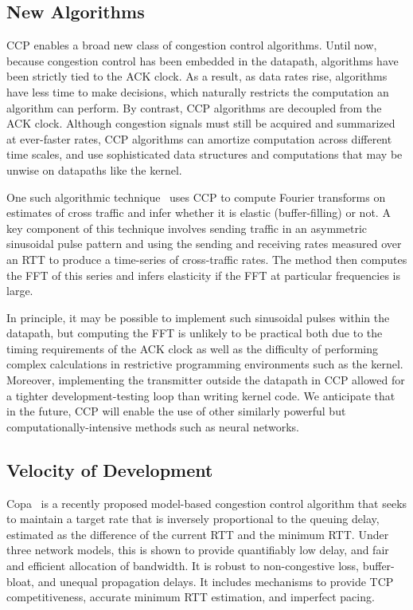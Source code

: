 \subsection{New Algorithms}
\label{s:capabilities:algs}

CCP enables a broad new class of congestion control algorithms.
Until now, because congestion control has been embedded in the datapath,
algorithms have been strictly tied to the ACK clock.
As a result, as data rates rise, algorithms have less time to make decisions,
which naturally restricts the computation an algorithm can perform.
By contrast, CCP algorithms are decoupled from the ACK clock.
Although congestion signals must still be acquired and summarized at ever-faster rates, CCP algorithms can amortize computation across different time scales, and use sophisticated data structures and computations that may be unwise on datapaths like the kernel.

One such algorithmic technique~\cite{nimbus} uses CCP to compute Fourier transforms on estimates of cross traffic and infer whether it is elastic (buffer-filling) or not.
A key component of this technique involves sending traffic in an asymmetric sinusoidal pulse pattern and using the sending and receiving rates measured over an RTT to produce a time-series of cross-traffic rates. The method then computes the FFT of this series and infers elasticity if the FFT at particular frequencies is large.

In principle, it may be possible to implement such sinusoidal pulses within the datapath, but computing the FFT is unlikely to be practical both due to the timing requirements of the ACK clock as well as the difficulty of performing complex calculations in restrictive programming environments such as the kernel. Moreover, implementing the transmitter outside the datapath in CCP allowed for a tighter development-testing loop than writing kernel code.
We anticipate that in the future, CCP will enable the use of other similarly powerful but computationally-intensive methods such as neural networks.

\subsection{Velocity of Development}
\label{s:capabilities:velocity}

Copa~\cite{copa} is a recently proposed model-based congestion control algorithm that seeks to maintain a target rate that is inversely proportional to the queuing delay, estimated as the difference of the current RTT and the minimum RTT.
Under three network models, this is shown to provide quantifiably low delay, and fair and efficient allocation of bandwidth.
It is robust to non-congestive loss, buffer-bloat, and unequal propagation delays. It includes mechanisms to provide TCP competitiveness, accurate minimum RTT estimation, and imperfect pacing.

